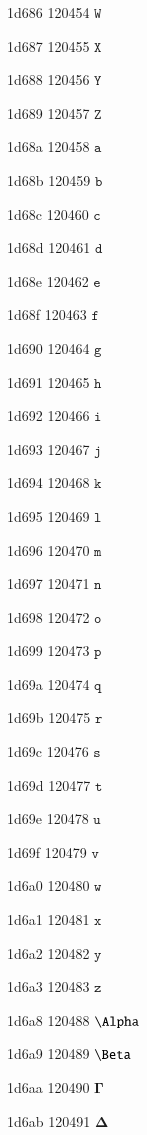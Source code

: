 \documentclass[11pt]{article}
\begin{document}
1d686 120454 \ensuremath{\mathtt{W}}

1d687 120455 \ensuremath{\mathtt{X}}

1d688 120456 \ensuremath{\mathtt{Y}}

1d689 120457 \ensuremath{\mathtt{Z}}

1d68a 120458 \ensuremath{\mathtt{a}}

1d68b 120459 \ensuremath{\mathtt{b}}

1d68c 120460 \ensuremath{\mathtt{c}}

1d68d 120461 \ensuremath{\mathtt{d}}

1d68e 120462 \ensuremath{\mathtt{e}}

1d68f 120463 \ensuremath{\mathtt{f}}

1d690 120464 \ensuremath{\mathtt{g}}

1d691 120465 \ensuremath{\mathtt{h}}

1d692 120466 \ensuremath{\mathtt{i}}

1d693 120467 \ensuremath{\mathtt{j}}

1d694 120468 \ensuremath{\mathtt{k}}

1d695 120469 \ensuremath{\mathtt{l}}

1d696 120470 \ensuremath{\mathtt{m}}

1d697 120471 \ensuremath{\mathtt{n}}

1d698 120472 \ensuremath{\mathtt{o}}

1d699 120473 \ensuremath{\mathtt{p}}

1d69a 120474 \ensuremath{\mathtt{q}}

1d69b 120475 \ensuremath{\mathtt{r}}

1d69c 120476 \ensuremath{\mathtt{s}}

1d69d 120477 \ensuremath{\mathtt{t}}

1d69e 120478 \ensuremath{\mathtt{u}}

1d69f 120479 \ensuremath{\mathtt{v}}

1d6a0 120480 \ensuremath{\mathtt{w}}

1d6a1 120481 \ensuremath{\mathtt{x}}

1d6a2 120482 \ensuremath{\mathtt{y}}

1d6a3 120483 \ensuremath{\mathtt{z}}

1d6a8 120488 \ensuremath{\mathbf{\Alpha}}

1d6a9 120489 \ensuremath{\mathbf{\Beta}}

1d6aa 120490 \ensuremath{\mathbf{\Gamma}}

1d6ab 120491 \ensuremath{\mathbf{\Delta}}
\end{document}
